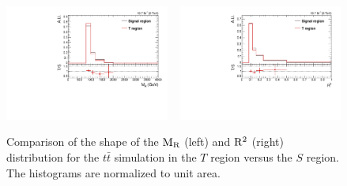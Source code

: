 % 
% 
% 
% 

\begin{figure}[htbp]
\centering
\includegraphics[width=0.48\textwidth]{figures/razor_selection/shapeplots/MR_comparison_TTJ_SIG}
~
\includegraphics[width=0.48\textwidth]{figures/razor_selection/shapeplots/R2_comparison_TTJ_SIG}
\caption{Comparison of the shape of the $\mathrm{M_R}$ (left) and $\mathrm{R^2}$ (right) distribution for the
$t\bar{t}$ simulation in the $T$ region versus the $S$ region. The histograms are normalized to
unit area. 
\label{fig:boost_T_region_shape}}
\end{figure}



